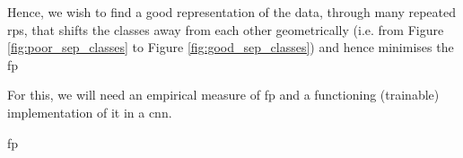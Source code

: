 
Hence, we wish to find a good representation of the data, through many repeated  \gls{rp}s, that shifts the classes away from each other geometrically (i.e. from Figure \ref{fig:poor_sep_classes} to Figure \ref{fig:good_sep_classes}) and hence minimises the \gls{fp} \bigskip

For this, we will need an empirical measure of \gls{fp} and a functioning (trainable) implementation of it in a \gls{cnn}. \bigskip

\gls{fp}